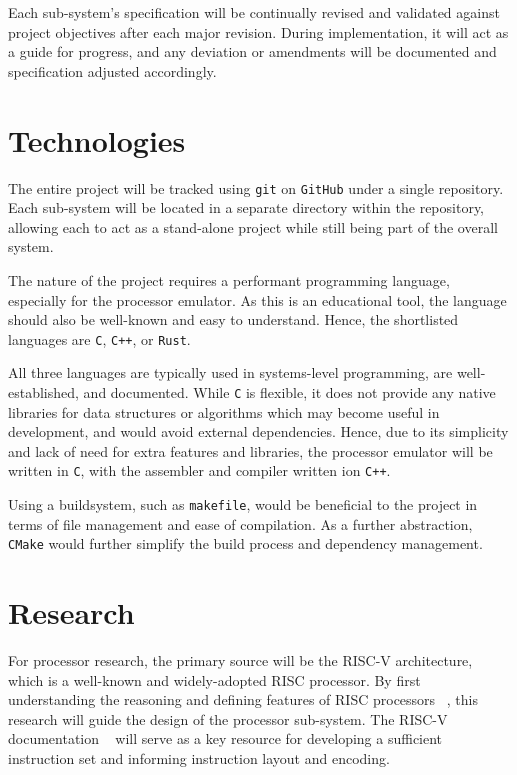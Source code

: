 \documentclass{article}
\begin{document}
    Each sub-system's specification will be continually revised and validated against project objectives after each major revision.
    During implementation, it will act as a guide for progress, and any deviation or amendments will be documented and specification adjusted accordingly.

    \section{Technologies}\label{sec:technologies}

    The entire project will be tracked using \texttt{git} on \texttt{GitHub} under a single repository.
    Each sub-system will be located in a separate directory within the repository, allowing each to act as a stand-alone project while still being part of the overall system.

    The nature of the project requires a performant programming language, especially for the processor emulator.
    As this is an educational tool, the language should also be well-known and easy to understand.
    Hence, the shortlisted languages are \texttt{C}, \texttt{C++}, or \texttt{Rust}.

    All three languages are typically used in systems-level programming, are well-established, and documented.
    While \texttt{C} is flexible, it does not provide any native libraries for data structures or algorithms which may become useful in development, and would avoid external dependencies.
    Hence, due to its simplicity and lack of need for extra features and libraries, the processor emulator will be written in \texttt{C}, with the assembler and compiler written ion \texttt{C++}.

    Using a buildsystem, such as \texttt{makefile}, would be beneficial to the project in terms of file management and ease of compilation.
    As a further abstraction, \texttt{CMake} would further simplify the build process and dependency management.

    \section{Research}\label{sec:research}

    For processor research, the primary source will be the RISC-V architecture, which is a well-known and widely-adopted RISC processor.
    By first understanding the reasoning and defining features of RISC processors ~\cite{risc-vs-cisc}, this research will guide the design of the processor sub-system.
    The RISC-V documentation ~\cite{riscv-docs} will serve as a key resource for developing a sufficient instruction set and informing instruction layout and encoding.
\end{document}
